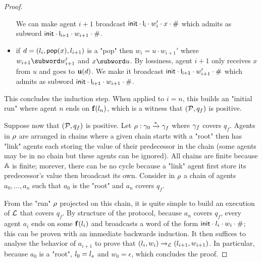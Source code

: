 \begin{proof}
\begin{itemize}
		We can make agent $i+1$ broadcast $\mathsf{init} \cdot \mathsf{l_i} \cdot w'_i \cdot x \cdot \mathsf{\#}$ which admits as subword $\mathsf{init} \cdot \mathsf{l_{i+1}} \cdot w_{i+1} \cdot \mathsf{\#}$.
		\item if $d =(l_i, \mathsf{pop}(x), l_{i+1})$ is a "pop" then $w_{i} = u \cdot w_{i+1}'$ where $w_{i+1} \subword w_{i+1}'$ and $x \subword u$. 
		By lossiness, agent $i+1$ only receives $x$ from $u$ and goes to $\mathbf{u}(d)$. We make it broadcast $\mathsf{init} \cdot \mathsf{l_{i+1}} \cdot w_{i+1}'  \cdot \mathsf{\#}$ which admits as subword $\mathsf{init} \cdot \mathsf{l_{i+1}} \cdot w_{i+1} \cdot \mathsf{\#}$.
	\end{itemize}
	This concludes the induction step.
	When applied to $i=n$, this builds an "initial run" where agent $n$ ends on $\mathbf{f}(l_n)$, which is a witness that $(\mathcal{P}, q_f)$ is positive.
	
	Suppose now that $(\mathcal{P}, q_f)$ is positive. Let $\rho: \gamma_0 \xrightarrow{*} \gamma_f$ where $\gamma_f$ covers $q_f$. Agents in $\rho$ are arranged in chains where a given chain starts with a "root" then has "link" agents each storing the value of their predecessor in the chain (some agents may be in no chain but these agents can be ignored). All chains are finite because $\mathbb{A}$ is finite; morever, there can be no cycle because a "link" agent first store its predecessor's value then broadcast its own. Consider in $\rho$ a chain of agents $a_0, \dots, a_n$ such that $a_0$ is the "root" and $a_n$ covers $q_f$. 
	
	From the "run" $\rho$ projected on this chain, it is quite simple to build an execution of $\mathcal{L}$ that covers $q_f$. By structure of the protocol, because $a_n$ covers $q_f$, every agent $a_i$ ends on some $\mathbf{f}(l_i)$ and broadcasts a word of the form $\mathsf{init} \cdot l_i \cdot w_i \cdot \mathsf{\#}$; this can be proven with an immediate backwards induction. It then suffices to analyse the behavior of $a_{i+1}$ to prove that $(l_i, w_i) \xrightarrow{}_{\mathcal{L}} (l_{i+1}, w_{i+1})$. In particular, because $a_0$ is a "root", $l_0 = l_s$ and $w_0 = \epsilon$, which concludes the proof. 
\end{proof}